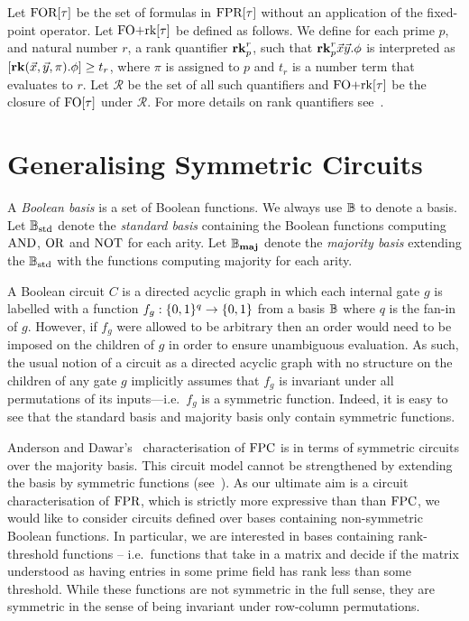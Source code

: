 \documentclass[a4paper,UKenglish]{lipics-v2018}
\begin{document}
Let $\text{\upshape FOR}[\tau]$ be the set of formulas in
$\text{\upshape FPR}[\tau]$ without an application of the fixed-point operator. Let
$\text{\upshape FO+rk}[\tau]$ be defined as follows. We define for each prime $p$, and natural
number $r$, a rank quantifier $\text{\textbf{rk}}^r_p$, such that $\text{\textbf{rk}}^r_p\vec{x}\vec{y}.
\phi$ is interpreted as $[\text{\textbf{rk}} (\vec{x}, \vec{y}, \pi) . \phi] \geq t_r$, where
$\pi$ is assigned to $p$ and $t_r$ is a number term that evaluates to $r$. Let
$\mathcal{R}$ be the set of all such quantifiers and $\text{\upshape FO+rk}[\tau]$ be the
closure of $\text{\upshape FO}[\tau]$ under $\mathcal{R}$. For more details on rank quantifiers
see~\cite{Dawar09logicswith}.


\section{Generalising Symmetric Circuits}\label{sec:symm-circ}
A \emph{Boolean basis} is a set of Boolean functions. We always use $\mathbb{B}$ to
denote a basis. Let $\mathbb{B}_{\text{std}}$ denote the \emph{standard basis} containing the
Boolean functions computing $\text{\upshape AND}$, $\text{\upshape OR}$ and $\text{\upshape NOT}$ for each arity. Let $\mathbb{B}_{\text{\textbf{maj}}}$
denote the \emph{majority basis} extending the $\mathbb{B}_{\text{std}}$ with the functions
computing majority for each arity.

A Boolean circuit $C$ is a directed acyclic graph in which each internal gate
$g$ is labelled with a function $f_g : \{0,1\}^q \rightarrow \{0,1\}$ from a basis $\mathbb{B}$
where $q$ is the fan-in of $g$. However, if $f_g$ were allowed to be arbitrary
then an order would need to be imposed on the children of $g$ in order to ensure
unambiguous evaluation. As such, the usual notion of a circuit as a directed
acyclic graph with no structure on the children of any gate $g$ implicitly
assumes that $f_g$ is invariant under all permutations of its inputs---i.e.\
$f_g$ is a symmetric function. Indeed, it is easy to see that the standard basis
and majority basis only contain symmetric functions.

Anderson and Dawar's~\cite{AndersonD17} characterisation of $\text{\upshape FPC}$ is in terms
of symmetric circuits over the majority basis. This circuit model cannot be
strengthened by extending the basis by symmetric functions
(see~\cite{DW-arxiv}). As our ultimate aim is a circuit characterisation of
$\text{\upshape FPR}$, which is strictly more expressive than than $\text{\upshape FPC}$, we would like to
consider circuits defined over bases containing non-symmetric Boolean functions.
In particular, we are interested in bases containing rank-threshold functions --
i.e.\ functions that take in a matrix and decide if the matrix understood as
having entries in some prime field has rank less than some threshold. While
these functions are not symmetric in the full sense, they are symmetric in the
sense of being invariant under row-column permutations.
\end{document}
